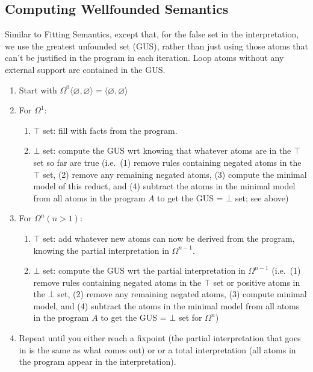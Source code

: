 \documentclass[9pt,a4paper,landscape]{article}
\begin{document}
{%

\subsection{Computing Wellfounded Semantics}
\label{subsec:wellf-sem}

Similar to Fitting Semantics, except that, for the false set in the interpretation, we use the greatest unfounded set (GUS), rather than just using those atoms that can't be justified in the program in each iteration.
Loop atoms without any external support are contained in the GUS.

\begin{enumerate}[noitemsep]
	\item Start with $\Omega^0 \langle \varnothing, \varnothing \rangle = \langle \varnothing, \varnothing \rangle$
	\item For $\Omega^1$:
	\begin{enumerate}[noitemsep]
		\item $\top$ set: fill with facts from the program.
		\item $\bot$ set: compute the GUS wrt knowing that whatever atoms are in the $\top$ set so far are true (i.e.\ (1) remove rules containing negated atoms in the $\top$ set, (2) remove any remaining negated atoms, (3) compute the minimal model of this reduct, and (4) subtract the atoms in the minimal model from all atoms in the program $A$ to get the GUS = $\bot$ set; see above)
	\end{enumerate}
	\item For $\Omega^n (n>1)$:
	\begin{enumerate}[noitemsep]
		\item $\top$ set: add whatever new atoms can now be derived from the program, knowing the partial interpretation in $\Omega^{n-1}$.
		\item $\bot$ set: compute the GUS wrt the partial interpretation in $\Omega^{n-1}$ (i.e.\ (1) remove rules containing negated atoms in the $\top$ set or positive atoms in the $\bot$ set, (2) remove any remaining negated atoms, (3) compute minimal model, and (4) subtract the atoms in the minimal model from all atoms in the program $A$ to get the GUS = $\bot$ set for  $\Omega^{n}$)
	\end{enumerate}	
	\item Repeat until you either reach a fixpoint (the partial interpretation that goes in is the same as what comes out) or or a total interpretation (all atoms in the program appear in the interpretation).
\end{enumerate}

}
\end{document}
